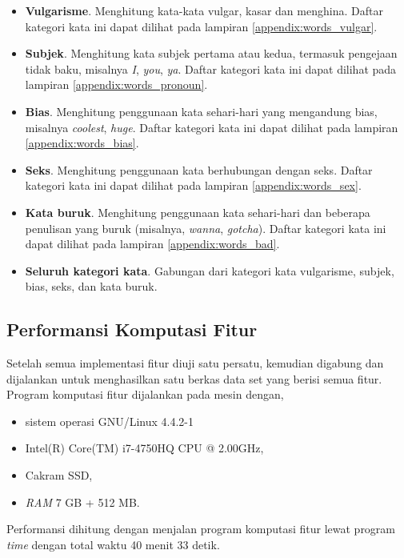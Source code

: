 \begin{itemize}
\item \textbf{Vulgarisme}.
Menghitung kata-kata vulgar, kasar dan menghina.
Daftar kategori kata ini dapat dilihat pada lampiran
\ref{appendix:words_vulgar}.

\item \textbf{Subjek}.
Menghitung kata subjek pertama atau kedua, termasuk pengejaan tidak baku,
misalnya \textit{I}, \textit{you}, \textit{ya}.
Daftar kategori kata ini dapat dilihat pada lampiran
\ref{appendix:words_pronoun}.

\item \textbf{Bias}.
Menghitung penggunaan kata sehari-hari yang mengandung bias, misalnya
\textit{coolest}, \textit{huge}.
Daftar kategori kata ini dapat dilihat pada lampiran
\ref{appendix:words_bias}.

\item \textbf{Seks}.
Menghitung penggunaan kata berhubungan dengan seks.
Daftar kategori kata ini dapat dilihat pada lampiran
\ref{appendix:words_sex}.

\item \textbf{Kata buruk}.
Menghitung penggunaan kata sehari-hari dan beberapa penulisan yang buruk
(misalnya, \textit{wanna}, \textit{gotcha}).
Daftar kategori kata ini dapat dilihat pada lampiran
\ref{appendix:words_bad}.

\item \textbf{Seluruh kategori kata}.
Gabungan dari kategori kata vulgarisme, subjek, bias, seks, dan kata buruk.

\end{itemize}

\subsection{Performansi Komputasi Fitur}

Setelah semua implementasi fitur diuji satu persatu, kemudian digabung dan dijalankan untuk
menghasilkan satu berkas data set yang berisi semua fitur.
Program komputasi fitur dijalankan pada mesin dengan,

\begin{itemize}
\item sistem operasi GNU/Linux 4.4.2-1
\item Intel(R) Core(TM) i7-4750HQ CPU @ 2.00GHz,
\item Cakram SSD,
\item \textit{RAM} 7 GB + 512 MB.
\end{itemize}

Performansi dihitung dengan menjalan program komputasi fitur lewat program
\textit{time} dengan total waktu 40 menit 33 detik.
